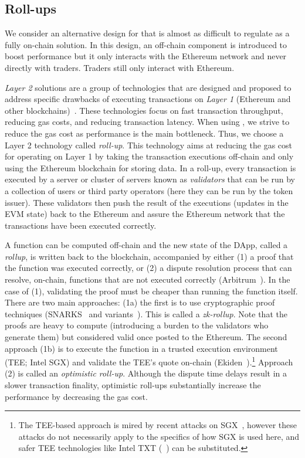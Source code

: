 \subsection{Roll-ups}

We consider an alternative design for \cm that is almost as difficult to regulate as a fully on-chain solution. In this design, an off-chain component is introduced to boost performance but it only interacts with the Ethereum network and never directly with traders. Traders still only interact with Ethereum.



\textit{Layer 2} solutions are a group of technologies that are designed and proposed to address specific drawbacks of executing transactions on \textit{Layer 1} (\ie Ethereum and other blockchains)~\cite{gudgeon2020sok}. These technologies focus on fast transaction throughput, reducing gas costs, and reducing transaction latency. When using \cm, we strive to reduce the gas cost as performance is the main bottleneck. Thus, we choose a Layer 2 technology called \textit{roll-up}. This technology aims at reducing the gas cost for operating on Layer 1 by taking the transaction executions off-chain and only using the Ethereum blockchain for storing data. In a roll-up, every transaction is executed by a server or cluster of servers known as \textit{validators} that can be run by a collection of users or third party operators (here they can be run by the token issuer). These validators then push the result of the executions (\ie updates in the EVM state) back to the Ethereum and assure the Ethereum network that the transactions have been executed correctly.

A function can be computed off-chain and the new state of the DApp, called a \textit{rollup}, is written back to the blockchain, accompanied by either (1) a proof that the function was executed correctly, or (2) a dispute resolution process that can resolve, on-chain, functions that are not executed correctly (\eg Arbitrum~\cite{kalodner2018arbitrum}). In the case of (1), validating the proof must be cheaper than running the function itself. There are two main approaches: (1a) the first is to use cryptographic proof techniques (\eg SNARKS~\cite{BCGTV13,GGPR13} and variants~\cite{BBHR19}). This is called a \textit{zk-rollup}. Note that the proofs are heavy to compute (introducing a burden to the validators who generate them) but considered valid once posted to the Ethereum. The second approach (1b) is to execute the function in a trusted execution environment (TEE; \eg Intel SGX) and validate the TEE's quote on-chain (\eg Ekiden~\cite{cheng2019ekiden}).\footnote{The TEE-based approach is mired by recent attacks on SGX~\cite{SGX1,SGX2,SGX3,SGX4}, however these attacks do not necessarily apply to the specifics of how SGX is used here, and safer TEE technologies like Intel TXT (\cf~\cite{ZBC+19}) can be substituted.} Approach (2) is called an \textit{optimistic roll-up}. Although the dispute time delays result in a slower transaction finality, optimistic roll-ups substantially increase the performance by decreasing the gas cost.

